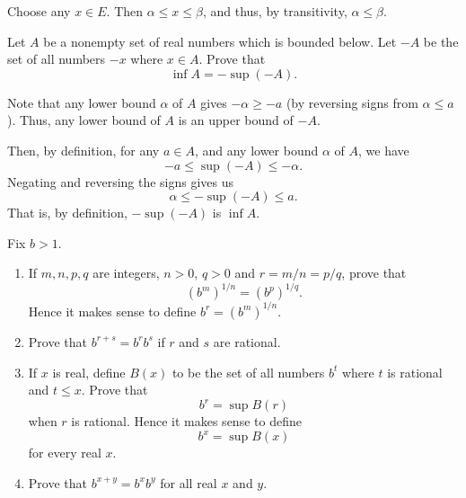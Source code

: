 \documentclass[12 pt, letterpaper]{hmcpset}
\begin{document}
\begin{solution}
	Choose any $x \in E$. Then $\alpha \le x \le \beta$, and thus, by transitivity, $\alpha \le \beta$.
\end{solution}

\pagebreak

\begin{problem}[5.]
	Let $A$ be a nonempty set of real numbers which is bounded below. Let $-A$ be the set of all numbers $-x$ where $x \in A$. Prove that
	\[
		\inf A = - \sup (-A).
	\]
\end{problem}

\begin{solution}
	Note that any lower bound $\alpha$ of $A$ gives $-\alpha \ge -a$ (by reversing signs from $\alpha \le a$). Thus, any lower bound of $A$ is an upper bound of $-A$.
	
	Then, by definition, for any $a \in A$, and any lower bound $\alpha$ of $A$, we have
	 \[
		-a \le \sup(-A) \le -\alpha.
	\]
	Negating and reversing the signs gives us
	\[
		\alpha \le -\sup(-A) \le a.
	\]
	That is, by definition, $-\sup(-A)$ is $\inf A$.
\end{solution}

\pagebreak

\begin{problem}[6.]
	Fix $b > 1$.
	\begin{enumerate}
		\item If $m, n, p, q$ are integers,  $n > 0$, $q > 0$ and $r = m/n = p/q$, prove that
			\[
				(b^{m})^{1/n} = (b^{p})^{1/q}.
			\]
			Hence it makes sense to define $b^{r} = (b^{m})^{1/n}$.
		\item Prove that $b^{r + s} = b^{r}b^{s}$ if $r$ and $s$ are rational.
		\item If $x$ is real, define $B(x)$ to be the set of all numbers $b^{t}$ where $t$ is rational and $t \le x$. Prove that
			\[
				b^{r} = \sup B(r)
			\]
			when $r$ is rational. Hence it makes sense to define
			\[
				b^{x} = \sup B(x)
			\]
			for every real $x$.
		\item Prove that $b^{x + y} = b^{x} b^{y}$ for all real $x$ and $y$.
	\end{enumerate}
\end{problem}
\end{document}
